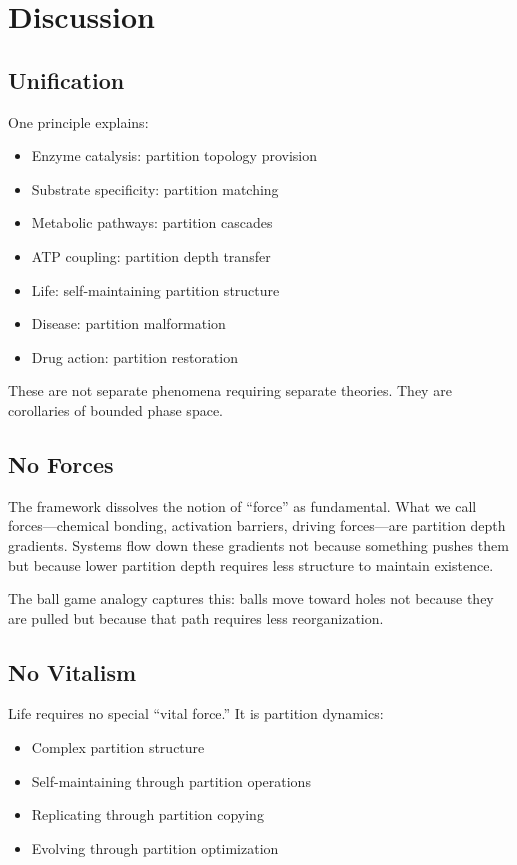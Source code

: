 ﻿\documentclass[twocolumn,10pt,a4paper]{article}
\theoremstyle{definition}
\theoremstyle{remark}
\begin{document}
\section{Discussion}
\label{sec:discussion}

\subsection{Unification}

One principle explains:
\begin{itemize}
    \item Enzyme catalysis: partition topology provision
    \item Substrate specificity: partition matching
    \item Metabolic pathways: partition cascades
    \item ATP coupling: partition depth transfer
    \item Life: self-maintaining partition structure
    \item Disease: partition malformation
    \item Drug action: partition restoration
\end{itemize}

These are not separate phenomena requiring separate theories. They are corollaries of bounded phase space.

\subsection{No Forces}

The framework dissolves the notion of ``force'' as fundamental. What we call forces---chemical bonding, activation barriers, driving forces---are partition depth gradients. Systems flow down these gradients not because something pushes them but because lower partition depth requires less structure to maintain existence.

The ball game analogy captures this: balls move toward holes not because they are pulled but because that path requires less reorganization.

\subsection{No Vitalism}

Life requires no special ``vital force.'' It is partition dynamics:
\begin{itemize}
    \item Complex partition structure
    \item Self-maintaining through partition operations
    \item Replicating through partition copying
    \item Evolving through partition optimization
\end{itemize}
\end{document}
